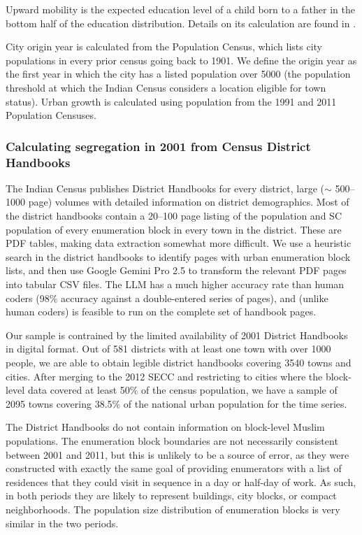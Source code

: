 \documentclass[12pt]{article}
\begin{document}
Upward mobility is the expected education level of a child born to a father in the bottom half of the education distribution. Details on its calculation are found in \citet{anr2022mob}.

City origin year is calculated from the Population Census, which lists city populations in every prior census going back to 1901. We define the origin year as the first year in which the city has a listed population over 5000 (the population threshold at which the Indian Census considers a location eligible for town status). Urban growth is calculated using population from the 1991 and 2011 Population Censuses.

  \subsubsection{Calculating segregation in 2001 from Census District Handbooks}

  The Indian Census publishes District Handbooks for every district, large ($\sim$ 500--1000 page) volumes with detailed information on district demographics. Most of the district handbooks contain a 20--100 page listing of the population and SC population of every enumeration block in every town in the district. These are PDF tables, making data extraction somewhat more difficult. We use a heuristic search in the district handbooks to identify pages with urban enumeration block lists, and then use Google Gemini Pro 2.5 to transform the relevant PDF pages into tabular CSV files. The LLM has a much higher accuracy rate than human coders (98\% accuracy against a double-entered series of pages), and (unlike human coders) is feasible to run on the complete set of handbook pages.

  Our sample is contrained by the limited availability of 2001 District Handbooks in digital format. Out of 581 districts with at least one town with over 1000 people, we are able to obtain legible district handbooks covering 3540 towns and cities. After merging to the 2012 SECC and restricting to cities where the block-level data covered at least 50\% of the census population, we have a sample of 2095 towns covering 38.5\% of the national urban population for the time series.

  The District Handbooks do not contain information on block-level Muslim populations. The enumeration block boundaries are not necessarily consistent between 2001 and 2011, but this is unlikely to be a source of error, as they were constructed with exactly the same goal of providing enumerators with a list of residences that they could visit in sequence in a day or half-day of work. As such, in both periods they are likely to represent buildings, city blocks, or compact neighborhoods. The population size distribution of enumeration blocks is very similar in the two periods.
\end{document}
